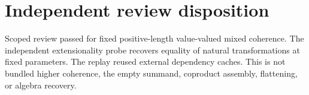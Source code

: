 \section*{Independent review disposition}
Scoped review passed for fixed positive-length value-valued mixed coherence. The independent extensionality probe recovers equality of natural transformations at fixed parameters. The replay reused external dependency caches. This is not bundled higher coherence, the empty summand, coproduct assembly, flattening, or algebra recovery.
